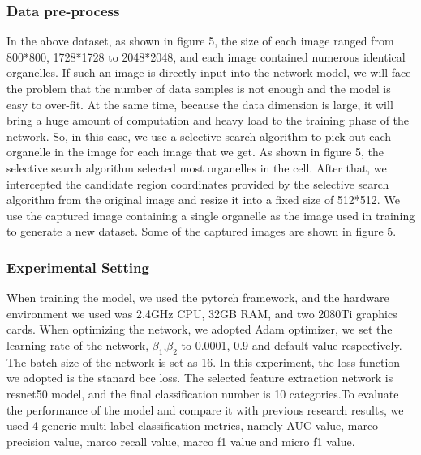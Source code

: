 \documentclass[10pt,twocolumn,letterpaper]{article}
\begin{document}
\subsubsection{Data pre-process}
In the above dataset, as shown in figure 5, the size of each image ranged from 800*800, 1728*1728 to 2048*2048, and each image contained numerous identical organelles. If such an image is directly input into the network model, we will face the problem that the number of data samples is not enough and the model is easy to over-fit. At the same time, because the data dimension is large, it will bring a huge amount of computation and heavy load to the training phase of the network. So, in this case, we use a selective search algorithm to pick out each organelle in the image for each image that we get. As shown in figure 5, the selective search algorithm selected most organelles in the cell. After that, we intercepted the candidate region coordinates provided by the selective search algorithm from the original image and resize it into a fixed size of 512*512. We use the captured image containing a single organelle as the image used in training to generate a new dataset. Some of the captured images are shown in figure 5.

\subsubsection{Experimental Setting}
When training the model, we used the pytorch framework, and the hardware environment we used was 2.4GHz CPU, 32GB RAM, and two 2080Ti graphics cards. When optimizing the network, we adopted Adam optimizer\cite{ref25}, we set the learning rate of the network, $\beta_1$,$\beta_2$ to 0.0001, 0.9 and default value respectively. The batch size of the network is set as 16. In this experiment, the loss function we adopted is the stanard bce loss. The selected feature extraction network is resnet50 model, and the final classification number is 10 categories.To evaluate the performance of the model and compare it with previous research results, we used 4 generic multi-label classification metrics, namely AUC value, marco precision value, marco recall value, marco f1 value and micro f1 value.

\end{document}
